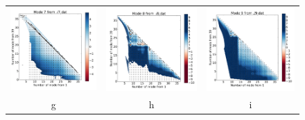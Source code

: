 \begin{figure}[H]
\begin{center}
\begin{tabular}{c c c}
				\includegraphics{image/image/P1-F331} & \includegraphics{image/image/P1-F332} & \includegraphics{image/image/P1-F333} \\
				g & h &i \\

\end{tabular}
\end{center}
\end{figure}

